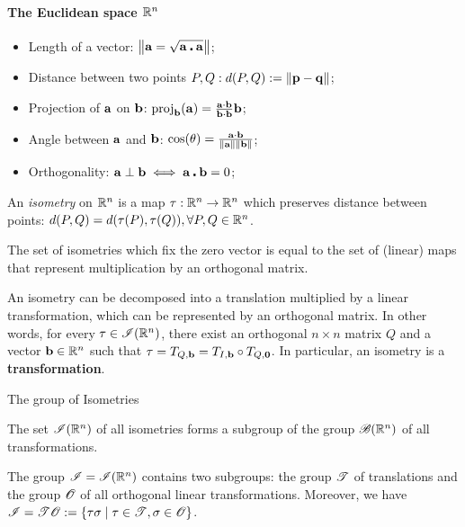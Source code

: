 \paragraph{The Euclidean space \(\mathbb{R}^n\)}
\begin{itemize}
    \item Length of a vector: \(\norm{\mathbf{a} = \sqrt{\mathbf{a \centerdot a}}}\);
    \item Distance between two points \(P, Q: d(P, Q) := \norm{\mathbf{p - q}}\);
    \item Projection of \(\mathbf{a}\) on \(\mathbf{b}\): \(\operatorname{proj}_{\mathbf{b}}(\mathbf{a}) = \frac{\mathbf{a} \cdot \mathbf{b}}{\mathbf{b} \cdot \mathbf{b}} \mathbf{b}\);
    \item Angle between \(\mathbf{a}\) and \(\mathbf{b}\): \(\cos(\theta) = \frac{\mathbf{a} \cdot \mathbf{b}}{\norm{\mathbf{a}}\norm{\mathbf{b}}}\);
    \item Orthogonality: \(\mathbf{a} \perp \mathbf{b} \iff \mathbf{a} \centerdot \mathbf{b} = 0\);
\end{itemize}

\begin{definition}
    An \textit{isometry} on \(\mathbb{R}^n\) is a map \(\tau : \mathbb{R}^n \to \mathbb{R}^n\) which preserves distance between points: \(d(P, Q) = d(\tau(P), \tau(Q)), \forall P, Q \in \mathbb{R}^n\).
\end{definition}

\begin{lemma}
    The set of isometries which fix the zero vector is equal to the set of (linear) maps that represent multiplication by an orthogonal matrix.
\end{lemma}

\begin{theorem}
    An isometry can be decomposed into a translation multiplied by a linear transformation, which can be represented by an orthogonal matrix. In other words, for every \(\tau \in \mathscr{I}(\mathbb{R}^n)\), there exist an orthogonal \(n \times n\) matrix \(Q\) and a vector \(\mathbf{b} \in \mathbb{R}^n\) such that \(\tau = T_{Q, \mathbf{b}} = T_{I, \mathbf{b}} \circ T_{Q, \mathbf{0}}\). In particular, an isometry is a \textbf{transformation}.
\end{theorem}

\begin{theorem}
    The group of Isometries
    \begin{statements}{}
        \item The set \(\mathscr{I}(\mathbb{R}^n)\) of all isometries forms a subgroup of the group \(\mathscr{B}(\mathbb{R}^n)\) of all transformations.
        \item The group \(\mathscr{I} = \mathscr{I}(\mathbb{R}^n)\) contains two subgroups: the group \(\mathscr{T}\) of translations and the group \(\mathscr{O}\) of all orthogonal linear transformations. Moreover, we have \(\mathscr{I} = \mathscr{T}\mathscr{O} := \{\tau \sigma \mid \tau \in \mathscr{T}, \sigma \in \mathscr{O} \}\).
    \end{statements}
\end{theorem}